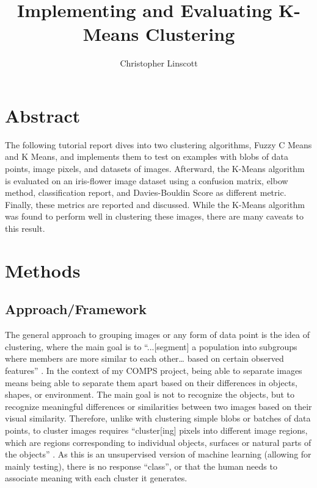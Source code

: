 \documentclass[10pt,twocolumn]{article}
\title{Implementing and Evaluating K-Means Clustering}
\author{Christopher Linscott}
\affiliation{Occidental College}
\begin{document}
\maketitle


\section {Abstract}

The following tutorial report dives into two clustering algorithms, Fuzzy C Means and K Means, and implements them to test on examples with blobs of data points, image pixels, and datasets of images. Afterward, the K-Means algorithm is evaluated on an iris-flower image dataset using a confusion matrix, elbow method, classification report, and Davies-Bouldin Score as different metric. Finally, these metrics are reported and discussed. While the K-Means algorithm was found to perform well in clustering these images, there are many caveats to this result.

\section {Methods}

\subsection {Approach/Framework}

The general approach to grouping images or any form of data point is the idea of clustering, where the main goal is to “...[segment] a population into subgroups where members are more similar to each other… based on certain observed features” \cite{C3Clustering}. In the context of my COMPS project, being able to separate images means being able to separate them apart based on their differences in objects, shapes, or environment. The main goal is not to recognize the objects, but to recognize meaningful differences or similarities between two images based on their visual similarity. Therefore, unlike with clustering simple blobs or batches of data points, to cluster images requires “cluster[ing] pixels into different image regions, which are regions corresponding to individual objects, surfaces or natural parts of the objects” \cite{Roy2014}. As this is an unsupervised version of machine learning (allowing for mainly testing), there is no response “class”, or that the human needs to associate meaning with each cluster it generates.
\end{document}
